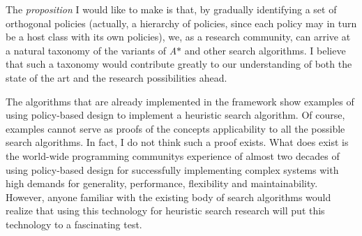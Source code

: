 The {\itshape proposition} I would like to make is that, by gradually identifying a set of orthogonal policies (actually, a hierarchy of policies, since each policy may in turn be a host class with its own policies), we, as a research community, can arrive at a natural taxonomy of the variants of {\itshape A$\ast$} and other search algorithms. I believe that such a taxonomy would contribute greatly to our understanding of both the state of the art and the research possibilities ahead.

The algorithms that are already implemented in the framework show examples of using policy-\/based design to implement a heuristic search algorithm. Of course, examples cannot serve as proofs of the concept\textquotesingle{}s applicability to all the possible search algorithms. In fact, I do not think such a proof exists. What does exist is the world-\/wide programming community\textquotesingle{}s experience of almost two decades of using policy-\/based design for successfully implementing complex systems with high demands for generality, performance, flexibility and maintainability. However, anyone familiar with the existing body of search algorithms would realize that using this technology for heuristic search research will put this technology to a fascinating test.

